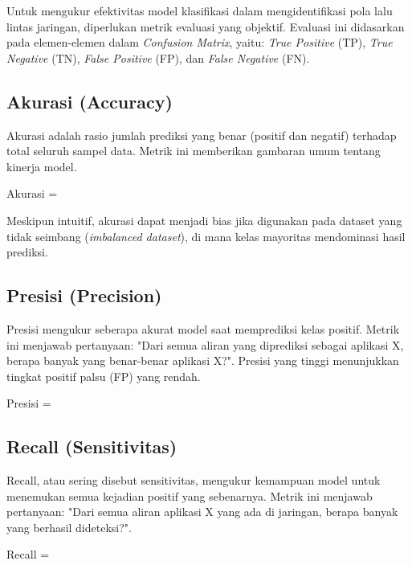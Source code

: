 Untuk mengukur efektivitas model klasifikasi dalam mengidentifikasi pola lalu lintas jaringan, diperlukan metrik evaluasi yang objektif. Evaluasi ini didasarkan pada elemen-elemen dalam \textit{Confusion Matrix}, yaitu: \textit{True Positive} (TP), \textit{True Negative} (TN), \textit{False Positive} (FP), dan \textit{False Negative} (FN).

\subsection{Akurasi (Accuracy)}
Akurasi adalah rasio jumlah prediksi yang benar (positif dan negatif) terhadap total seluruh sampel data. Metrik ini memberikan gambaran umum tentang kinerja model.

\begin{myequation}{Akurasi}
    \label{eq:accuracy}
     = 
\end{myequation}

Meskipun intuitif, akurasi dapat menjadi bias jika digunakan pada dataset yang tidak seimbang (\textit{imbalanced dataset}), di mana kelas mayoritas mendominasi hasil prediksi.

\subsection{Presisi (Precision)}
Presisi mengukur seberapa akurat model saat memprediksi kelas positif. Metrik ini menjawab pertanyaan: "Dari semua aliran yang diprediksi sebagai aplikasi X, berapa banyak yang benar-benar aplikasi X?". Presisi yang tinggi menunjukkan tingkat positif palsu (FP) yang rendah.

\begin{myequation}{Presisi}
    \label{eq:precision}
     = 
\end{myequation}

\subsection{Recall (Sensitivitas)}
Recall, atau sering disebut sensitivitas, mengukur kemampuan model untuk menemukan semua kejadian positif yang sebenarnya. Metrik ini menjawab pertanyaan: "Dari semua aliran aplikasi X yang ada di jaringan, berapa banyak yang berhasil dideteksi?".

\begin{myequation}{Recall}
    \label{eq:recall}
     = 
\end{myequation}


